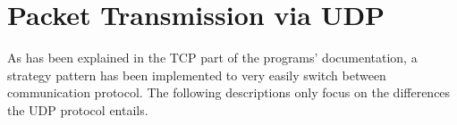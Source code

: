 \section{Packet Transmission via UDP}
As has been explained in the TCP part of the programs' documentation, a strategy pattern has been implemented to very easily switch between communication protocol. The following descriptions only focus on the differences the UDP protocol entails.




